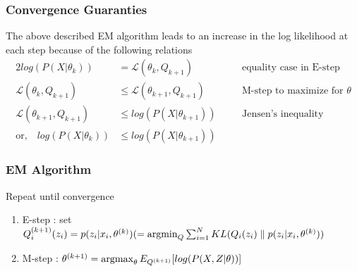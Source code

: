 \documentclass[../../statistical_learning_notes.tex]{subfiles}
\begin{document}
\subsubsection*{Convergence Guaranties}
The above described EM algorithm leads to an increase in the log likelihood at each step because of the following relations
\begin{alignat*}{2}
    log(P(X|\theta_{k})) &= \mathcal{L}(\theta_{k}, Q_{k+1}) \quad &&\text{equality case in E-step}\\
    \mathcal{L}(\theta_{k}, Q_{k+1}) &\leq \mathcal{L}(\theta_{k+1}, Q_{k+1}) \quad &&\text{M-step to maximize for $\theta$}\\
    \mathcal{L}(\theta_{k+1}, Q_{k+1}) &\leq log(P(X|\theta_{k+1})) \quad &&\text{Jensen's inequality}\\
    \text{or,} \quad log(P(X|\theta_{k})) &\leq log(P(X|\theta_{k+1}))
\end{alignat*}

\subsubsection*{EM Algorithm}
Repeat until convergence
\begin{enumerate}
    \item E-step : set $Q^{(k+1)}_{i}(z_{i}) = p(z_{i}|x_{i}, \theta^{(k)}) (= \operatorname*{argmin}_{Q} \sum_{i=1}^{N}KL(Q_{i}(z_{i}) \parallel p(z_{i}|x_{i}, \theta^{(k)}))$
    \item M-step : $\theta^{(k+1)} = \operatorname*{argmax}_{\theta} E_{Q^{(k+1)}}[log(P(X,Z|\theta))]$
\end{enumerate}
\end{document}
